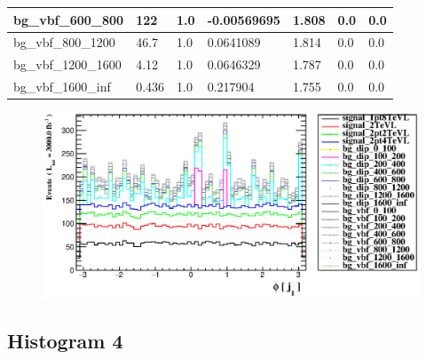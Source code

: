 \documentclass[a4paper, 10pt]{article}
\begin{document}
\begin{table}[H]
\begin{center}
\begin{tabular}{|m{23.0mm}|m{23.0mm}|m{18.0mm}|m{19.0mm}|m{19.0mm}|m{19.0mm}|m{19.0mm}|}
      \hline
      {\cellcolor{white}         bg\_vbf\_600\_800}& {\cellcolor{white}         122}& {\cellcolor{white}         1.0}& {\cellcolor{white}         -0.00569695}& {\cellcolor{white}         1.808}& {\cellcolor{green}         0.0}& {\cellcolor{green}         0.0}\\
      \hline
      {\cellcolor{white}         bg\_vbf\_800\_1200}& {\cellcolor{white}         46.7}& {\cellcolor{white}         1.0}& {\cellcolor{white}         0.0641089}& {\cellcolor{white}         1.814}& {\cellcolor{green}         0.0}& {\cellcolor{green}         0.0}\\
      \hline
      {\cellcolor{white}         bg\_vbf\_1200\_1600}& {\cellcolor{white}         4.12}& {\cellcolor{white}         1.0}& {\cellcolor{white}         0.0646329}& {\cellcolor{white}         1.787}& {\cellcolor{green}         0.0}& {\cellcolor{green}         0.0}\\
      \hline
      {\cellcolor{white}         bg\_vbf\_1600\_inf}& {\cellcolor{white}         0.436}& {\cellcolor{white}         1.0}& {\cellcolor{white}         0.217904}& {\cellcolor{white}         1.755}& {\cellcolor{green}         0.0}& {\cellcolor{green}         0.0}\\
\hline
    \end{tabular}
  \end{center}
\end{table}

\begin{figure}[H]
  \begin{center}
    \includegraphics[scale=0.45]{selection_2.eps}\\
\caption{   }
  \end{center}
\end{figure}
      \newpage
\subsection{ Histogram 4}
\end{document}
